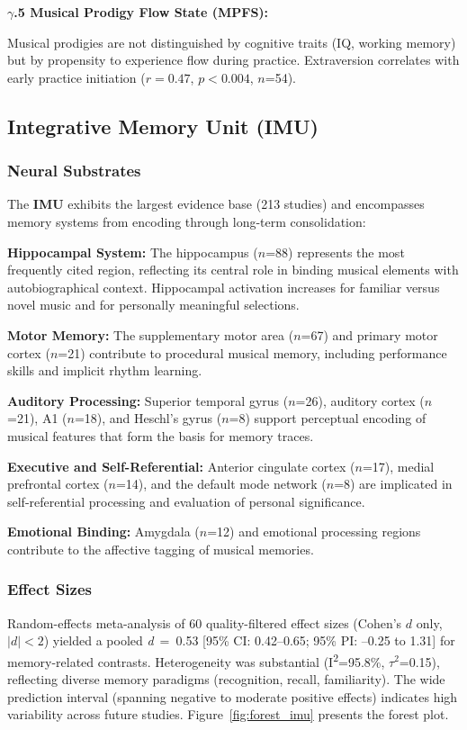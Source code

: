 \documentclass[9pt,onecolumn]{article}
\newcommand{\IMU}{\textcolor{imucolor}{\textbf{IMU}}}
\newcommand{\cohend}[1]{\textit{d}~=~#1}
\newcommand{\Isquared}{I\textsuperscript{2}}
\newcommand{\tausquared}{$\tau^2$}
\begin{document}
\textbf{$\gamma$.5 Musical Prodigy Flow State (MPFS):}

Musical prodigies are not distinguished by cognitive traits (IQ, working memory) but by propensity to experience flow during practice. Extraversion correlates with early practice initiation ($r=0.47$, $p<0.004$, $n$=54).

\subsection{Integrative Memory Unit (\IMU{})}

\subsubsection{Neural Substrates}

The \IMU{} exhibits the largest evidence base (213 studies) and encompasses memory systems from encoding through long-term consolidation:

\textbf{Hippocampal System:} The hippocampus ($n$=88) represents the most frequently cited region, reflecting its central role in binding musical elements with autobiographical context. Hippocampal activation increases for familiar versus novel music and for personally meaningful selections.

\textbf{Motor Memory:} The supplementary motor area ($n$=67) and primary motor cortex ($n$=21) contribute to procedural musical memory, including performance skills and implicit rhythm learning.

\textbf{Auditory Processing:} Superior temporal gyrus ($n$=26), auditory cortex ($n$=21), A1 ($n$=18), and Heschl's gyrus ($n$=8) support perceptual encoding of musical features that form the basis for memory traces.

\textbf{Executive and Self-Referential:} Anterior cingulate cortex ($n$=17), medial prefrontal cortex ($n$=14), and the default mode network ($n$=8) are implicated in self-referential processing and evaluation of personal significance.

\textbf{Emotional Binding:} Amygdala ($n$=12) and emotional processing regions contribute to the affective tagging of musical memories.

\subsubsection{Effect Sizes}

Random-effects meta-analysis of 60 quality-filtered effect sizes (Cohen's $d$ only, $|d|<2$) yielded a pooled \cohend{0.53} [95\% CI: 0.42--0.65; 95\% PI: --0.25 to 1.31] for memory-related contrasts. Heterogeneity was substantial (\Isquared{}=95.8\%, \tausquared{}=0.15), reflecting diverse memory paradigms (recognition, recall, familiarity). The wide prediction interval (spanning negative to moderate positive effects) indicates high variability across future studies. Figure~\ref{fig:forest_imu} presents the forest plot.
\end{document}
